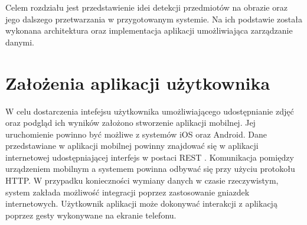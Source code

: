 Celem rozdziału jest przedstawienie idei detekcji przedmiotów na obrazie oraz jego dalszego przetwarzania w przygotowanym systemie. Na ich podstawie została wykonana architektura oraz implementacja aplikacji umożliwiająca zarządzanie danymi. 


\section{Założenia aplikacji użytkownika}{
W celu dostarczenia intefejsu użytkownika umożliwiającego udostępnianie zdjęć oraz podgląd ich wyników założono stworzenie aplikacji mobilnej. Jej uruchomienie powinno być możliwe z systemów iOS oraz Android. Dane przedstawiane w aplikacji mobilnej powinny znajdować się w aplikacji internetowej udostępniającej interfejs w postaci REST \cite{REST}. Komunikacja pomiędzy urządzeniem mobilnym a systemem powinna odbywać się przy użyciu protokołu HTTP. W przypadku konieczności wymiany danych w czasie rzeczywistym, system zakłada możliwość integracji poprzez zastosowanie gniazdek internetowych. Użytkownik aplikacji może dokonywać interakcji z aplikacją poprzez gesty wykonywane na ekranie telefonu. 
}

